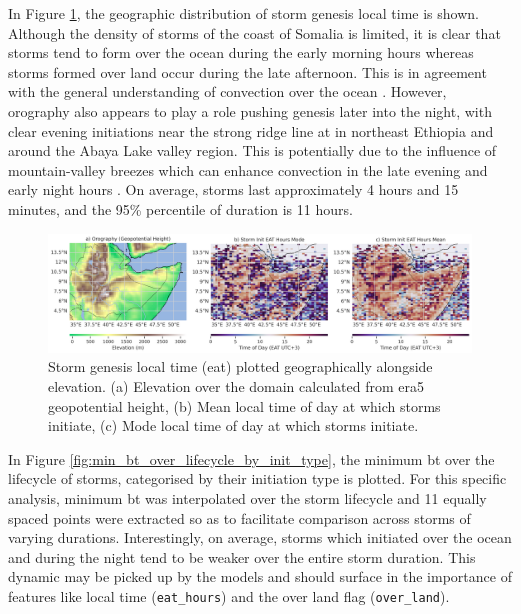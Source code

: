 In Figure \ref{fig:orography_storm_init_eat_hours_mode_mean}, the geographic distribution of storm genesis local time is shown. Although the density of storms of the coast of Somalia is limited, it is clear that storms tend to form over the ocean during the early morning hours whereas storms formed over land occur during the late afternoon. This is in agreement with the general understanding of convection over the ocean \citep{Hall1999,Houze2004}. However, orography also appears to play a role pushing genesis later into the night, with clear evening initiations near the strong ridge line at  in northeast Ethiopia and around the Abaya Lake valley region. This is potentially due to the influence of mountain-valley breezes which can enhance convection in the late evening and early night hours \citep{Zardi2013}. On average, storms last approximately 4 hours and 15 minutes, and the 95\% percentile of duration is 11 hours.

\begin{figure}[ht]
    \centering
    \includegraphics[width=\textwidth]{../figures/generated/exploration/orography_storm_init_eat_hours_mode_mean.png}
    \caption{Storm genesis local time (\acrlong{eat}) plotted geographically alongside elevation. (a) Elevation over the domain calculated from \acrshort{era5} geopotential height, (b) Mean local time of day at which storms initiate, (c) Mode local time of day at which storms initiate.}
    \label{fig:orography_storm_init_eat_hours_mode_mean}
\end{figure}

In Figure \ref{fig:min_bt_over_lifecycle_by_init_type}, the minimum \acrfull{bt} over the lifecycle of storms, categorised by their initiation type is plotted. For this specific analysis, minimum \acrshort{bt} was interpolated over the storm lifecycle and 11 equally spaced points were extracted so as to facilitate comparison across storms of varying durations. Interestingly, on average, storms which initiated over the ocean and during the night tend to be weaker over the entire storm duration. This dynamic may be picked up by the models and should surface in the importance of features like local time (\texttt{eat\_hours}) and the over land flag (\texttt{over\_land}). 

